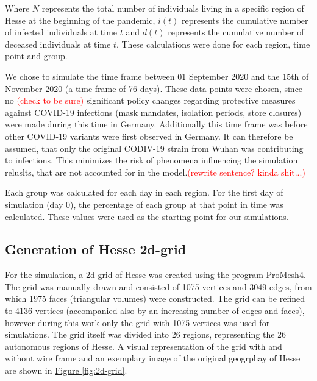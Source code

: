 \par
Where $N$ represents the total number of individuals living in a specific region of Hesse at the beginning of the pandemic, $i(t)$
represents the cumulative number of infected individuals at time $t$ and $d(t)$ represents the cumulative number of deceased
individuals at time $t$. These calculations were done for each region, time point and group.\newline

\par
We chose to simulate the time frame between 01 September 2020 and the 15{th} of November 2020 (a time frame of 76 days). These
data points were chosen, since no
\textcolor{red}{(check to be sure)} %
significant policy changes regarding protective measures against COVID-19 infections (mask mandates, isolation periods, store closures) 
were made during this time in Germany. Additionally this time frame was before other COVID-19 variants were first observed in
Germany\cite{??}. It can therefore be assumed, that only the original CODIV-19 strain from Wuhan was contributing to infections.
This minimizes the risk of phenomena influencing the simulation reluslts, that are not accounted for in the model.\textcolor{red}{(rewrite sentence? kinda shit...)}\newline

\par
Each group was calculated for each day in each region. For the first day of simulation (day 0), the percentage of each group at that
point in time was calculated. These values were used as the starting point for our simulations.


\subsection{Generation of Hesse 2d-grid}
For the simulation, a 2d-grid of Hesse was created using the program ProMesh4. The grid was manually drawn and consisted
of 1075 vertices and 3049 edges, from which 1975 faces (triangular volumes) were constructed. The grid can be refined
to 4136 vertices (accompanied also by an increasing number of edges and faces), however during this work only the grid
with 1075 vertices was used for simulations. The grid itself was divided into 26 regions, representing the 26 autonomous
regions of Hesse. A visual representation of the grid with and without wire frame and an exemplary image of the original geogrphay
of Hesse are shown in \hyperref[fig:2d-grid]{Figure \ref*{fig:2d-grid}}.

